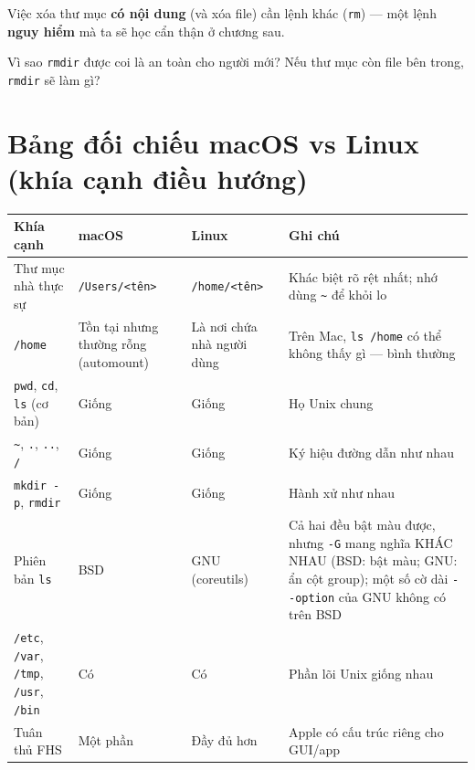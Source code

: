\documentclass[12pt,a4paper]{article}
\newcommand{\hm}{\textasciitilde{}}
\begin{document}
\begin{warnbox}
Việc xóa thư mục \textbf{có nội dung} (và xóa file) cần lệnh khác (\texttt{rm}) --- một lệnh \textbf{nguy hiểm} mà ta sẽ học cẩn thận ở chương sau.
\end{warnbox}

\begin{checkbox}[title={Tự kiểm tra 6}]
Vì sao \texttt{rmdir} được coi là an toàn cho người mới? Nếu thư mục còn file bên trong, \texttt{rmdir} sẽ làm gì?
\end{checkbox}

\section{Bảng đối chiếu macOS vs Linux (khía cạnh điều hướng)}

\renewcommand{\arraystretch}{1.4}
\begin{longtable}{>{\raggedright\arraybackslash}p{3cm} >{\raggedright\arraybackslash}p{3cm} >{\raggedright\arraybackslash}p{3cm} >{\raggedright\arraybackslash}p{4cm}}
\rowcolor{checkback}
\textbf{Khía cạnh} & \textbf{macOS} & \textbf{Linux} & \textbf{Ghi chú} \\
\hline
\endhead
Thư mục nhà thực sự & \texttt{/Users/<tên>} & \texttt{/home/<tên>} & Khác biệt rõ rệt nhất; nhớ dùng \texttt{\hm} để khỏi lo \\
\texttt{/home} & Tồn tại nhưng thường rỗng (automount) & Là nơi chứa nhà người dùng & Trên Mac, \texttt{ls /home} có thể không thấy gì --- bình thường \\
\texttt{pwd}, \texttt{cd}, \texttt{ls} (cơ bản) & Giống & Giống & Họ Unix chung \\
\texttt{\hm}, \texttt{.}, \texttt{..}, \texttt{/} & Giống & Giống & Ký hiệu đường dẫn như nhau \\
\texttt{mkdir -p}, \texttt{rmdir} & Giống & Giống & Hành xử như nhau \\
Phiên bản \texttt{ls} & BSD & GNU (coreutils) & Cả hai đều bật màu được, nhưng \texttt{-G} mang nghĩa KHÁC NHAU (BSD: bật màu; GNU: ẩn cột group); một số cờ dài \texttt{-{}-option} của GNU không có trên BSD \\
\texttt{/etc}, \texttt{/var}, \texttt{/tmp}, \texttt{/usr}, \texttt{/bin} & Có & Có & Phần lõi Unix giống nhau \\
Tuân thủ FHS & Một phần & Đầy đủ hơn & Apple có cấu trúc riêng cho GUI/app \\
\end{longtable}
\renewcommand{\arraystretch}{1}
\end{document}
